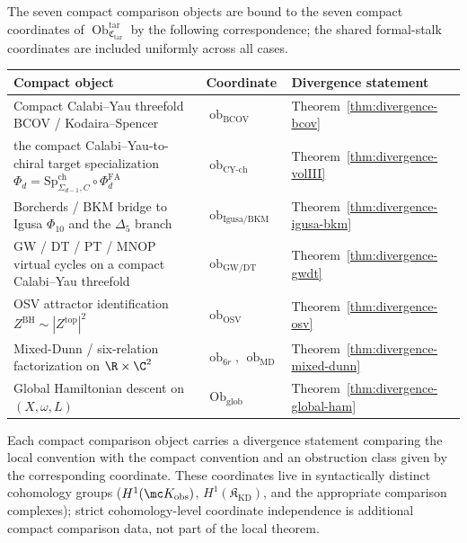 The seven compact comparison objects are bound to the seven compact
coordinates of
\(\operatorname{Ob}_{\mathfrak C_{\mathrm{tar}}}^{\mathrm{tar}}\)
by the following correspondence; the shared formal-stalk coordinates
are included uniformly across all cases.
\begin{center}
\begin{tabular}{@{}p{}p{}p{}@{}}
\textbf{Compact object}
  & \textbf{Coordinate}
  & \textbf{Divergence statement} \\
\hline
Compact Calabi--Yau threefold BCOV / Kodaira--Spencer
\cite{bcov}
  & \(\operatorname{ob}_{\mathrm{BCOV}}\)
  & Theorem~\ref{thm:divergence-bcov} \\
the compact Calabi--Yau-to-chiral target specialization
\(\Phi_d=\mathrm{Sp}^{\mathrm{ch}}_{\Sigma_{d-1},C}\circ
\Phi^{\mathrm{FA}}_d\)
  & \(\operatorname{ob}_{\mathrm{CY\mbox{-}ch}}\)
  & Theorem~\ref{thm:divergence-volIII} \\
Borcherds / BKM bridge to Igusa \(\Phi_{10}\) and the
\(\Delta_5\) branch
  & \(\operatorname{ob}_{\mathrm{Igusa/BKM}}\)
  & Theorem~\ref{thm:divergence-igusa-bkm} \\
GW / DT / PT / MNOP virtual cycles on a compact Calabi--Yau threefold
  & \(\operatorname{ob}_{\mathrm{GW/DT}}\)
  & Theorem~\ref{thm:divergence-gwdt} \\
OSV attractor identification
\(Z^{\mathrm{BH}}\sim|Z^{\mathrm{top}}|^2\)
  & \(\operatorname{ob}_{\mathrm{OSV}}\)
  & Theorem~\ref{thm:divergence-osv} \\
Mixed-Dunn / six-relation factorization on
\(\R\times\C^2\)
  & \(\operatorname{ob}_{6r},\,\operatorname{ob}_{\mathrm{MD}}\)
  & Theorem~\ref{thm:divergence-mixed-dunn} \\
Global Hamiltonian descent on
\((X,\omega,L)\)
  & \(\operatorname{Ob}_{\mathrm{glob}}\)
  & Theorem~\ref{thm:divergence-global-ham} \\
\end{tabular}
\end{center}
Each compact comparison object carries a divergence statement comparing
the local convention with the compact convention and an obstruction
class given by the corresponding coordinate.  These coordinates live
in syntactically distinct cohomology groups
(\(H^1(\mc K_{\mathrm{obs}})\), \(H^1(\mathfrak K_{\mathrm{KD}})\),
  and the appropriate comparison complexes); strict cohomology-level
coordinate independence is additional compact comparison data, not part
of the local theorem.


